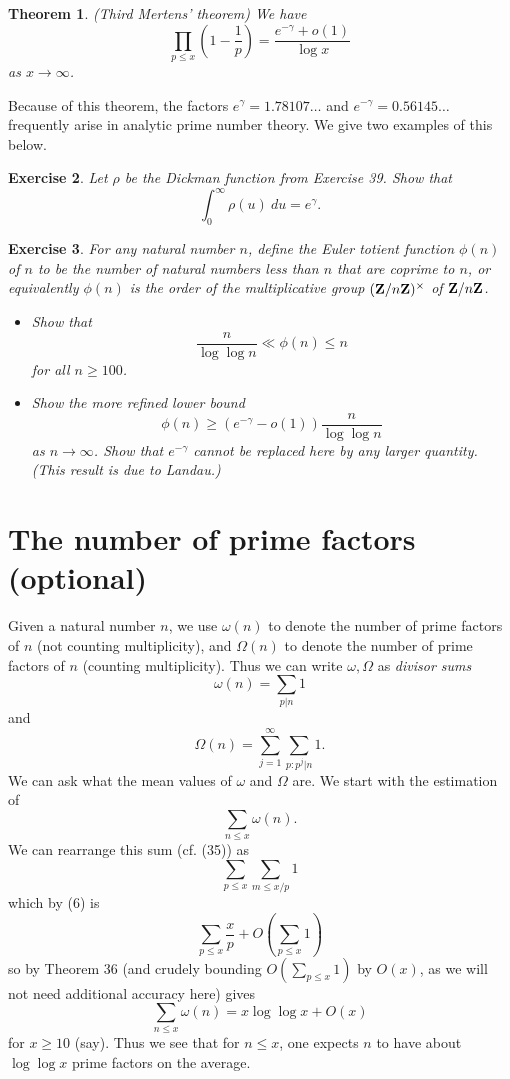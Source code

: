 \documentclass[10pt,reqno]{amsart}
\newtheorem{theorem}{Theorem}
\newtheorem{exercise}[theorem]{Exercise}
\begin{document}
\begin{theorem} (Third Mertens’ theorem) We have
    \[  \prod_{p \leq x} (1 - \frac{1}{p}) = \frac{e^{-\gamma} + o(1)}{\log x}\]
    as $x \rightarrow \infty$.
\end{theorem}

Because of this theorem, the factors $e^\gamma = 1.78107\dots$ and $e^{-\gamma} = 0.56145\dots$ frequently arise in analytic prime number theory. We give two examples of this below.

\begin{exercise} Let $\rho$ be the Dickman function from Exercise 39. Show that
%
\[ \int_0^\infty \rho(u)\ du = e^\gamma. \]
\end{exercise}

\begin{exercise}
    For any natural number $n$, define the \emph{Euler totient function} $\phi(n)$ of $n$ to be the number of natural numbers less than $n$ that are coprime to $n$, or equivalently $\phi(n)$ is the order of the multiplicative group $({\bf Z}/n{\bf Z})^\times$ of ${\bf Z}/n{\bf Z}$.
    \begin{itemize}
        \item[(i)] Show that
        \[  \frac{n}{\log\log n} \ll \phi(n) \leq n\]
        for all $n \geq 100$.

        \item[(ii)] Show the more refined lower bound
        \[  \phi(n) \geq (e^{-\gamma} - o(1)) \frac{n}{\log\log n}\]
        as $n \rightarrow \infty$. Show that $e^{-\gamma}$ cannot be replaced here by any larger quantity. (This result is due to Landau.)
    \end{itemize}
\end{exercise}

\section{The number of prime factors (optional)}

Given a natural number $n$, we use $\omega(n)$ to denote the number of prime factors of $n$ (not counting multiplicity), and $\Omega(n)$ to denote the number of prime factors of $n$ (counting multiplicity). Thus we can write $\omega,\Omega$ as \emph{divisor sums}
%
\begin{equation}   \omega(n) = \sum_{p|n} 1 \end{equation}
%
and
%
\[  \Omega(n) = \sum_{j=1}^\infty \sum_{p: p^j|n} 1.\]
%
We can ask what the mean values of $\omega$ and $\Omega$ are. We start with the estimation of
%
\[  \sum_{n \leq x} \omega(n).\]
%
We can rearrange this sum (cf. (35)) as
%
\[  \sum_{p \leq x} \sum_{m \leq x/p} 1\]
%
which by (6) is
%
\[  \sum_{p \leq x} \frac{x}{p} + O \left( \sum_{p \leq x} 1 \right) \]
%
so by Theorem 36 (and crudely bounding $O( \sum_{p \leq x} 1 )$ by $O(x)$, as we will not need additional accuracy here) gives
%
\begin{equation}   \sum_{n \leq x} \omega(n) = x \log \log x + O(x) \end{equation}
%
for $x \geq 10$ (say). Thus we see that for $n \leq x$, one expects $n$ to have about $\log\log x$ prime factors on the average.
\end{document}
